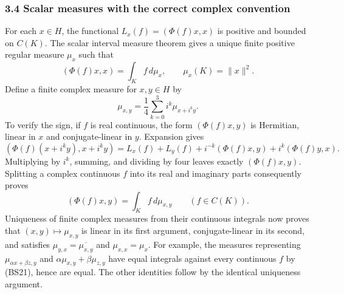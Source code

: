 \documentclass[
  11pt,
]{article}
\begin{document}
\subsubsection{3.4 Scalar measures with the correct complex
convention}\label{scalar-measures-with-the-correct-complex-convention}

For each \(x\in H\), the functional \(L_x(f)=(\Phi(f)x,x)\) is positive
and bounded on \(C(K)\). The scalar interval measure theorem gives a
unique finite positive regular measure \(\mu_x\) such that \[
 (\Phi(f)x,x)=\int_K f\,d\mu_x,
 \qquad\mu_x(K)=\|x\|^2.
 \tag{BS19}
\] Define a finite complex measure for \(x,y\in H\) by \[
 \mu_{x,y}=\frac14\sum_{k=0}^3i^k\mu_{x+i^k y}.
 \tag{BS20}
\] To verify the sign, if \(f\) is real continuous, the form
\((\Phi(f)x,y)\) is Hermitian, linear in \(x\) and conjugate-linear in
\(y\). Expansion gives \[
 (\Phi(f)(x+i^k y),x+i^k y)
 =L_x(f)+L_y(f)+i^{-k}(\Phi(f)x,y)
                         +i^k(\Phi(f)y,x).
\] Multiplying by \(i^k\), summing, and dividing by four leaves exactly
\((\Phi(f)x,y)\). Splitting a complex continuous \(f\) into its real and
imaginary parts consequently proves \[
 (\Phi(f)x,y)=\int_K f\,d\mu_{x,y}
 \qquad(f\in C(K)).
 \tag{BS21}
\] Uniqueness of finite complex measures from their continuous integrals
now proves that \((x,y)\mapsto\mu_{x,y}\) is linear in its first
argument, conjugate-linear in its second, and satisfies
\(\mu_{y,x}=\overline{\mu_{x,y}}\) and \(\mu_{x,x}=\mu_x\). For example,
the measures representing \(\mu_{\alpha x+\beta z,y}\) and
\(\alpha\mu_{x,y}+\beta\mu_{z,y}\) have equal integrals against every
continuous \(f\) by (BS21), hence are equal. The other identities follow
by the identical uniqueness argument.
\end{document}
